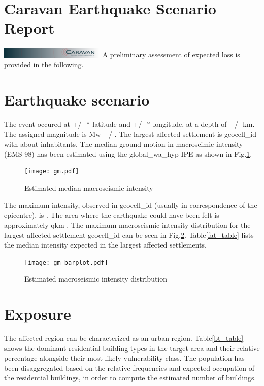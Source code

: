 \documentclass{article}
\begin{document}
\section*{Caravan Earthquake Scenario Report}
\includegraphics[width=5cm]{../caravan/static/imgs/banner0.png}
A preliminary assessment of expected loss is provided in the following.
\section*{Earthquake scenario}
The event occured at +/{-} $\degree$ latitude 
and +/{-} $\degree$ longitude, 
at a depth of +/{-} km. 
The assigned magnitude is Mw +/{-}. 
The largest affected settlement is geocell\_id  with about  inhabitants. The median ground motion in macroseimic intensity (EMS{-}98) has been estimated using the global\_wa\_hyp IPE as shown in Fig.\ref{gm_fig}.


\begin{figure}[h!]
\centering
\texttt{[image: gm.pdf]}
\caption{Estimated median macroseismic intensity}
\label{gm_fig}
\end{figure}


The maximum intensity, observed in geocell\_id  (usually in correspondence of the epicentre), is . The area where the earthquake could have been felt is approximately  qkm .
The maximum macroseismic intensity distribution for the largest affected settlement geocell\_id  can be seen in Fig.\ref{gm_barplot}. 
Table\ref{fat_table} lists the median intensity expected in the  largest affected settlements.


\begin{figure}[h!]
\centering
\texttt{[image: gm\_barplot.pdf]}
\caption{Estimated macroseismic intensity distribution}
\label{gm_barplot}
\end{figure}


\section*{Exposure}
The affected region can be characterized as an urban region.
Table\ref{bt_table} shows the  dominant residential building types in the target area and their relative percentage alongside their most likely vulnerability class.
The population has been disaggregated based on the relative frequencies and expected occupation of the residential buildings, in order to compute the estimated number of buildings.
\end{document}

